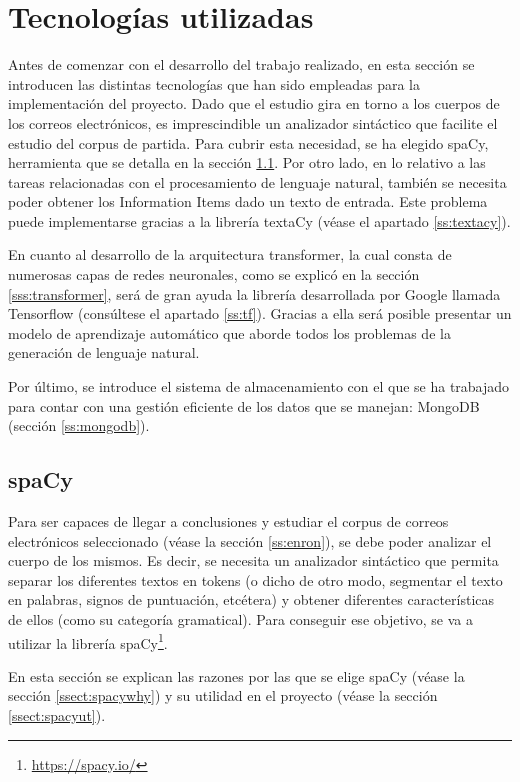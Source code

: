 \section{Tecnologías utilizadas}\label{s:tech}
Antes de comenzar con el desarrollo del trabajo realizado, en esta sección se introducen las distintas tecnologías que han sido empleadas para la implementación del proyecto. Dado que el estudio gira en torno a los cuerpos de los correos electrónicos, es imprescindible un analizador sintáctico que facilite el estudio del corpus de partida. Para cubrir esta necesidad, se ha elegido spaCy, herramienta que se detalla en la sección \ref{ss:spacy}. Por otro lado, en lo relativo a las tareas relacionadas con el procesamiento de lenguaje natural, también se necesita poder obtener los Information Items dado un texto de entrada. Este problema puede implementarse gracias a la librería textaCy (véase el apartado \ref{ss:textacy}).

En cuanto al desarrollo de la arquitectura transformer, la cual consta de numerosas capas de redes neuronales, como se explicó en la sección \ref{sss:transformer}, será de gran ayuda la librería desarrollada por Google llamada Tensorflow (consúltese el apartado \ref{ss:tf}). Gracias a ella será posible presentar un modelo de aprendizaje automático que aborde todos los problemas de la generación de lenguaje natural.

Por último, se introduce el sistema de almacenamiento con el que se ha trabajado para contar con una gestión eficiente de los datos que se manejan: MongoDB (sección \ref{ss:mongodb}).

\subsection{spaCy}\label{ss:spacy}
Para ser capaces de llegar a conclusiones y estudiar el corpus de correos electrónicos seleccionado (véase la sección \ref{ss:enron}), se debe poder analizar el cuerpo de los mismos. Es decir, se necesita un analizador sintáctico que permita separar los diferentes textos en tokens (o dicho de otro modo, segmentar el texto en palabras, signos de puntuación, etcétera) y obtener diferentes características de ellos (como su categoría gramatical). Para conseguir ese objetivo, se va a utilizar la librería spaCy\footnote{\url{https://spacy.io/}}.

En esta sección se explican las razones por las que se elige spaCy (véase la sección \ref{ssect:spacywhy}) y su utilidad en el proyecto (véase la sección \ref{ssect:spacyut}).

